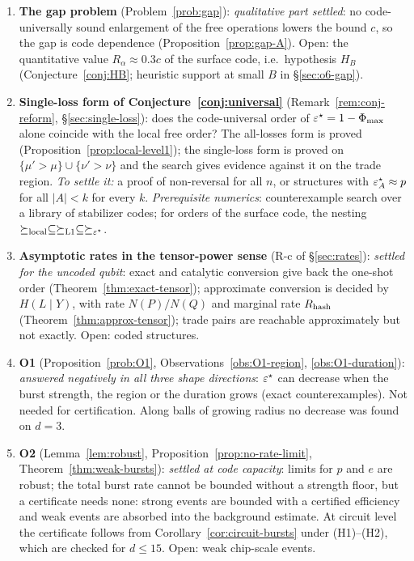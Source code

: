 \begin{enumerate}
\item \textbf{The gap problem} (Problem~\ref{prob:gap}): \emph{qualitative part settled}: no code-universally sound enlargement of the free operations lowers the bound $c$, so the gap is code dependence (Proposition~\ref{prop:gap-A}). Open: the quantitative value $R_\alpha\approx0.3c$ of the surface code, i.e.\ hypothesis $H_B$ (Conjecture~\ref{conj:HB}; heuristic support at small $B$ in \S\ref{sec:o6-gap}).
\item \textbf{Single-loss form of Conjecture~\ref{conj:universal}} (Remark~\ref{rem:conj-reform}, \S\ref{sec:single-loss}): does the code-universal order of $\varepsilon^{\star}=1-\Phi_{\max}$ alone coincide with the local free order? The all-losses form is proved (Proposition~\ref{prop:local-level1}); the single-loss form is proved on $\{\mu'>\mu\}\cup\{\nu'>\nu\}$ and the search gives evidence against it on the trade region. \emph{To settle it:} a proof of non-reversal for all $n$, or structures with $\varepsilon^{\star}_A\approx p$ for all $|A|<k$ for every $k$. 
  \emph{Prerequisite numerics}: counterexample search over a library of stabilizer codes; for orders of the surface code, the nesting $\succeq_{\rm local}\subseteq\succeq_{\mathrm{L1}}\subseteq\succeq_{\varepsilon^{\star}}$.
\item \textbf{Asymptotic rates in the tensor-power sense} (R-c of \S\ref{sec:rates}): \emph{settled for the uncoded qubit}: exact and catalytic conversion give back the one-shot order (Theorem~\ref{thm:exact-tensor}); approximate conversion is decided by $H(L\mid Y)$, with rate $N(P)/N(Q)$ and marginal rate $R_{\rm hash}$ (Theorem~\ref{thm:approx-tensor}); trade pairs are reachable approximately but not exactly. Open: coded structures.
\item \textbf{O1} (Proposition~\ref{prob:O1}, Observations~\ref{obs:O1-region}, \ref{obs:O1-duration}): \emph{answered negatively in all three shape directions}: $\varepsilon^{\star}$ can decrease when the burst strength, the region or the duration grows (exact counterexamples). Not needed for certification. Along balls of growing radius no decrease was found on $d=3$.
\item \textbf{O2} (Lemma~\ref{lem:robust}, Proposition~\ref{prop:no-rate-limit}, Theorem~\ref{thm:weak-bursts}): \emph{settled at code capacity}: limits for $p$ and $e$ are robust; the total burst rate cannot be bounded without a strength floor, but a certificate needs none: strong events are bounded with a certified efficiency and weak events are absorbed into the background estimate. At circuit level the certificate follows from Corollary~\ref{cor:circuit-bursts} under (H1)--(H2), which are checked for $d\le15$. Open: weak chip-scale events.

\end{enumerate}
